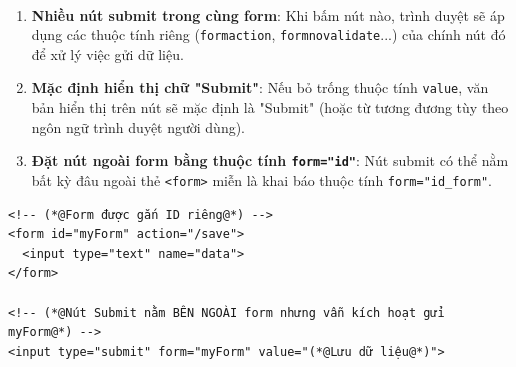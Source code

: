 \documentclass[11pt,oneside]{book}
\newcommand{\codeinline}[1]{\textcolor{accentOrange}{\texttt{#1}}}
\begin{document}
\begin{browserWindow}
\sffamily\small
{} \\[6pt]
 \quad
{} \quad
{}
\end{browserWindow}

\begin{warnBox}
\begin{enumerate}[leftmargin=1.5em, itemsep=3pt, parsep=0pt]
    \item \textbf{Nhiều nút submit trong cùng form}: Khi bấm nút nào, trình duyệt sẽ áp dụng các thuộc tính riêng (\codeinline{formaction}, \codeinline{formnovalidate}...) của chính nút đó để xử lý việc gửi dữ liệu.
    \item \textbf{Mặc định hiển thị chữ "Submit"}: Nếu bỏ trống thuộc tính \codeinline{value}, văn bản hiển thị trên nút sẽ mặc định là "Submit" (hoặc từ tương đương tùy theo ngôn ngữ trình duyệt người dùng).
    \item \textbf{Đặt nút ngoài form bằng thuộc tính \codeinline{form="id"}}: Nút submit có thể nằm bất kỳ đâu ngoài thẻ \codeinline{<form>} miễn là khai báo thuộc tính \codeinline{form="id\_form"}.
\end{enumerate}
\end{warnBox}

\begin{codeWindow}
\begin{lstlisting}[language=HTML5]
<!-- (*@Form được gắn ID riêng@*) -->
<form id="myForm" action="/save">
  <input type="text" name="data">
</form>

<!-- (*@Nút Submit nằm BÊN NGOÀI form nhưng vẫn kích hoạt gửi myForm@*) -->
<input type="submit" form="myForm" value="(*@Lưu dữ liệu@*)">
\end{lstlisting}
\end{codeWindow}
\end{document}
